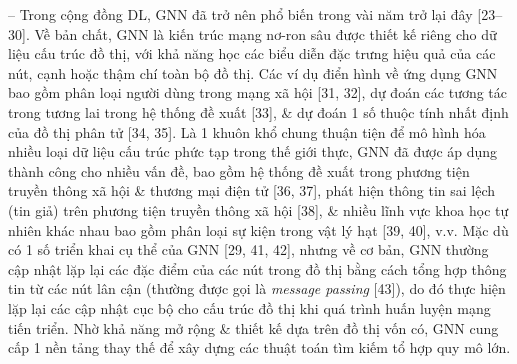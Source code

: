 \documentclass{article}
\begin{document}
\begin{itemize}
    -- Trong cộng đồng DL, GNN đã trở nên phổ biến trong vài năm trở lại đây [23–30]. Về bản chất, GNN là kiến trúc mạng nơ-ron sâu được thiết kế riêng cho dữ liệu cấu trúc đồ thị, với khả năng học các biểu diễn đặc trưng hiệu quả của các nút, cạnh hoặc thậm chí toàn bộ đồ thị. Các ví dụ điển hình về ứng dụng GNN bao gồm phân loại người dùng trong mạng xã hội [31, 32], dự đoán các tương tác trong tương lai trong hệ thống đề xuất [33], \& dự đoán 1 số thuộc tính nhất định của đồ thị phân tử [34, 35]. Là 1 khuôn khổ chung thuận tiện để mô hình hóa nhiều loại dữ liệu cấu trúc phức tạp trong thế giới thực, GNN đã được áp dụng thành công cho nhiều vấn đề, bao gồm hệ thống đề xuất trong phương tiện truyền thông xã hội \& thương mại điện tử [36, 37], phát hiện thông tin sai lệch (tin giả) trên phương tiện truyền thông xã hội [38], \& nhiều lĩnh vực khoa học tự nhiên khác nhau bao gồm phân loại sự kiện trong vật lý hạt [39, 40], v.v. Mặc dù có 1 số triển khai cụ thể của GNN [29, 41, 42], nhưng về cơ bản, GNN thường cập nhật lặp lại các đặc điểm của các nút trong đồ thị bằng cách tổng hợp thông tin từ các nút lân cận (thường được gọi là {\it message passing} [43]), do đó thực hiện lặp lại các cập nhật cục bộ cho cấu trúc đồ thị khi quá trình huấn luyện mạng tiến triển. Nhờ khả năng mở rộng \& thiết kế dựa trên đồ thị vốn có, GNN cung cấp 1 nền tảng thay thế để xây dựng các thuật toán tìm kiếm tổ hợp quy mô lớn.


\end{itemize}
\end{document}

